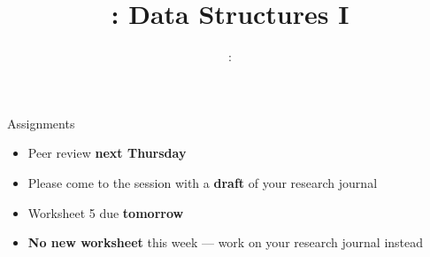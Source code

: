 \usepackage{../../beamerthemeFalmouthGamesAcademy}
\usepackage{multimedia}
\graphicspath{ {../../} }

\lstset{language=Python
}

\usepackage[normalem]{ulem}
\usepackage{wasysym}

\usepackage{algpseudocode}

\usepackage{pdfpages}
\usepackage{qtree}

\usetikzlibrary{arrows,automata}
\usetikzlibrary{tikzmark,calc}




\title{\sessionnumber: Data Structures I}
\subtitle{\modulecode: \moduletitle}

\frame{\titlepage} 


\begin{frame}{Assignments}
	\begin{itemize}
		\item Peer review \textbf{next Thursday}
		\item Please come to the session with a \textbf{draft} of your research journal
	\end{itemize}
	\vspace{3ex}
	\begin{itemize}
		\item Worksheet 5 due \textbf{tomorrow}
		\item \textbf{No new worksheet} this week --- work on your research journal instead
	\end{itemize}
\end{frame}






%
%
%


